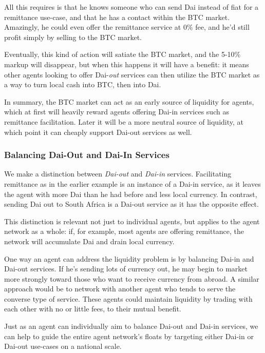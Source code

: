 \documentclass{article}
\begin{document}
All this requires is that he knows someone who can send Dai instead of fiat for a remittance use-case, and that he has a contact within the BTC market. Amazingly, he could even offer the remittance service at 0\% fee, and he'd still profit simply by selling to the BTC market.

Eventually, this kind of action will satiate the BTC market, and the 5-10\% markup will disappear, but when this happens it will have a benefit: it means other agents looking to offer Dai-\textit{out} services can then utilize the BTC market as a way to turn local cash into BTC, then into Dai.

In summary, the BTC market can act as an early source of liquidity for agents, which at first will heavily reward agents offering Dai-in services such as remittance facilitation. Later it will be a more neutral source of liquidity, at which point it can cheaply support Dai-out services as well.

\subsubsection{Balancing Dai-Out and Dai-In Services} \label{dai-out dai-in}

We make a distinction between \textit{Dai-out} and \textit{Dai-in} services. Facilitating remittance as in the earlier example is an instance of a Dai-in service, as it leaves the agent with more Dai than he had before and less local currency. In contrast, sending Dai out to South Africa is a Dai-out service as it has the opposite effect.

This distinction is relevant not just to individual agents, but applies to the agent network as a whole: if, for example, most agents are offering remittance, the network will accumulate Dai and drain local currency.

One way an agent can address the liquidity problem is by balancing Dai-in and Dai-out services. If he's sending lots of currency out, he may begin to market more strongly toward those who want to receive currency from abroad. A similar approach would be to network with another agent who tends to serve the converse type of service. These agents could maintain liquidity by trading with each other with no or little fees, to their mutual benefit.

Just as an agent can individually aim to balance Dai-out and Dai-in services, we can help to guide the entire agent network's floats by targeting either Dai-in or Dai-out use-cases on a national scale.
\end{document}
